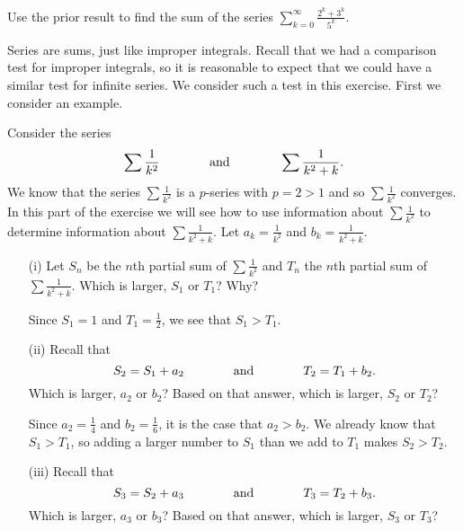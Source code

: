 \begin{exercises}
\begin{itemize}
        \end{itemize}

\item Use the prior result to find the sum of the series $ \sum_{k=0}^{\infty} \frac{2^k+3^k}{5^k}$.

\ea

\item \label{ex:8.3_Direct_Comparison_Test} Series are sums, just like improper integrals. Recall that we had a comparison test for improper integrals, so it is reasonable to expect that we could have a similar test for infinite series. We consider such a test in this exercise. First we consider an example.
    \ba
    \item Consider the series
\[\sum \frac{1}{k^2} \hspace{0.5in} \text{ and } \hspace{0.5in} \sum \frac{1}{k^2+k}.\]
We know that the series $ \sum \frac{1}{k^2}$ is a $p$-series with $p = 2 > 1$ and so $ \sum \frac{1}{k^2}$ converges. In this part of the exercise we will see how to use information about $ \sum \frac{1}{k^2}$ to determine information about $ \sum \frac{1}{k^2+k}$. Let $a_k = \frac{1}{k^2}$ and $b_k = \frac{1}{k^2+k}$.
        \begin{itemize}
        \item[(i)] Let $S_n$ be the $n$th partial sum of $ \sum \frac{1}{k^2}$ and $T_n$ the $n$th partial sum of $ \sum \frac{1}{k^2+k}$. Which is larger, $S_1$ or $T_1$? Why?

\begin{exerciseSolution}
Since $S_1 = 1$ and $T_1 = \frac{1}{2}$, we see that $S_1 > T_1$.
\end{exerciseSolution}

        \item[(ii)] Recall that
\[S_2 = S_1 + a_2 \hspace{0.5in} \text{ and } \hspace{0.5in} T_2 = T_1 + b_2.\]
Which is larger, $a_2$ or $b_2$? Based on that answer, which is larger, $S_2$ or $T_2$?

\begin{exerciseSolution}
Since $a_2 = \frac{1}{4}$ and $b_2 = \frac{1}{6}$, it is the case that $a_2 > b_2$. We already know that $S_1 > T_1$, so adding a larger number to $S_1$ than we add to $T_1$ makes $S_2 > T_2$.
\end{exerciseSolution}

        \item[(iii)] Recall that
\[S_3 = S_2 + a_3 \hspace{0.5in} \text{ and } \hspace{0.5in} T_3 = T_2 + b_3.\]
Which is larger, $a_3$ or $b_3$? Based on that answer, which is larger, $S_3$ or $T_3$?


\end{itemize}
\end{exercises}
